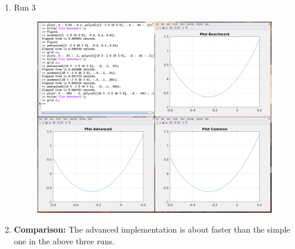 \documentclass[12pt,a4paper]{article}
\begin{document}
\begin{enumerate}[leftmargin=!,labelindent=5pt]
	\item Run 3
		\begin{figure}[H]
			\centering
			\includegraphics[scale=0.45]{./img/poly_comp_03.png}\label{fig:1}
		\end{figure}

	\item \textbf{Comparison:}
		\newline
		\newline The advanced implementation is about faster than the simple one
		in the above three runs.
\end{enumerate}

\newpage
\end{document}
